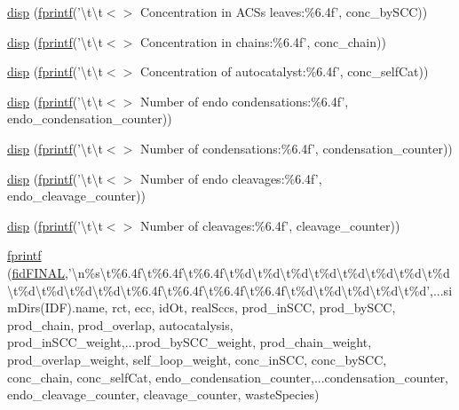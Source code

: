 \begin{DoxyCompactItemize}
\item 
\hyperlink{a00028_a34bf7a57ea8ae066cf1e5c01b32bdd4d}{disp} (\hyperlink{a00110_aa6dc40efe43a338c9ff278260d95b4d9}{fprintf}('\textbackslash{}t\textbackslash{}t$<$$>$ Concentration in A\+C\+Ss leaves\+:\%6.\+4f', conc\+\_\+by\+S\+C\+C))
\item 
\hyperlink{a00028_a256942e80fd0c5c2bd6309534555fd75}{disp} (\hyperlink{a00110_aa6dc40efe43a338c9ff278260d95b4d9}{fprintf}('\textbackslash{}t\textbackslash{}t$<$$>$ Concentration in chains\+:\%6.\+4f', conc\+\_\+chain))
\item 
\hyperlink{a00028_a261f832d1a1067e74920d3cbf69004e1}{disp} (\hyperlink{a00110_aa6dc40efe43a338c9ff278260d95b4d9}{fprintf}('\textbackslash{}t\textbackslash{}t$<$$>$ Concentration of autocatalyst\+:\%6.\+4f', conc\+\_\+self\+Cat))
\item 
\hyperlink{a00028_a6aede18da1d62981d435c8c0dd6f2ddf}{disp} (\hyperlink{a00110_aa6dc40efe43a338c9ff278260d95b4d9}{fprintf}('\textbackslash{}t\textbackslash{}t$<$$>$ Number of endo condensations\+:\%6.\+4f', endo\+\_\+condensation\+\_\+counter))
\item 
\hyperlink{a00028_a0874488aa8c9fd11198c91c0a04e306a}{disp} (\hyperlink{a00110_aa6dc40efe43a338c9ff278260d95b4d9}{fprintf}('\textbackslash{}t\textbackslash{}t$<$$>$ Number of condensations\+:\%6.\+4f', condensation\+\_\+counter))
\item 
\hyperlink{a00028_a0853607f4ab1ee1147e28518633ffa95}{disp} (\hyperlink{a00110_aa6dc40efe43a338c9ff278260d95b4d9}{fprintf}('\textbackslash{}t\textbackslash{}t$<$$>$ Number of endo cleavages\+:\%6.\+4f', endo\+\_\+cleavage\+\_\+counter))
\item 
\hyperlink{a00028_addecf583f3edbdfaa0e69cb8a9bb6586}{disp} (\hyperlink{a00110_aa6dc40efe43a338c9ff278260d95b4d9}{fprintf}('\textbackslash{}t\textbackslash{}t$<$$>$ Number of cleavages\+:\%6.\+4f', cleavage\+\_\+counter))
\item 
\hyperlink{a00028_af79a1146c94c3bcca287ad78df8a0c42}{fprintf} (\hyperlink{a00028_a2f1bf22f6a0c3f5791577061e92c0433}{fid\+F\+I\+N\+A\+L},'\textbackslash{}n\%s\textbackslash{}t\%6.\+4f\textbackslash{}t\%6.\+4f\textbackslash{}t\%6.\+4f\textbackslash{}t\%d\textbackslash{}t\%d\textbackslash{}t\%d\textbackslash{}t\%d\textbackslash{}t\%d\textbackslash{}t\%d\textbackslash{}t\%d\textbackslash{}t\%d\textbackslash{}t\%d\textbackslash{}t\%d\textbackslash{}t\%d\textbackslash{}t\%d\textbackslash{}t\%6.\+4f\textbackslash{}t\%6.\+4f\textbackslash{}t\%6.\+4f\textbackslash{}t\%6.\+4f\textbackslash{}t\%d\textbackslash{}t\%d\textbackslash{}t\%d\textbackslash{}t\%d\textbackslash{}t\%d',...\+sim\+Dirs(\+I\+D\+F).\+name, rct, ecc, id\+Ot, real\+Sccs, prod\+\_\+in\+S\+C\+C, prod\+\_\+by\+S\+C\+C, prod\+\_\+chain, prod\+\_\+overlap, autocatalysis, prod\+\_\+in\+S\+C\+C\+\_\+weight,...\+prod\+\_\+by\+S\+C\+C\+\_\+weight, prod\+\_\+chain\+\_\+weight, prod\+\_\+overlap\+\_\+weight, self\+\_\+loop\+\_\+weight, conc\+\_\+in\+S\+C\+C, conc\+\_\+by\+S\+C\+C, conc\+\_\+chain, conc\+\_\+self\+Cat, endo\+\_\+condensation\+\_\+counter,...\+condensation\+\_\+counter, endo\+\_\+cleavage\+\_\+counter, cleavage\+\_\+counter, waste\+Species)
$$
\end{DoxyCompactItemize}
